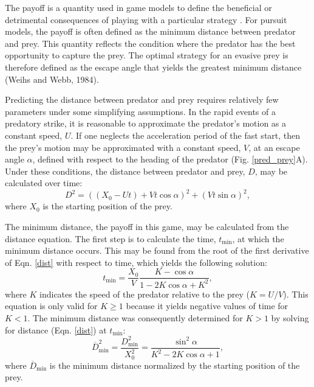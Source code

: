 \documentclass[12pt]{article}
\newcommand{\ol}{\overline}
\begin{document}
The payoff is a quantity used in game models to define the beneficial or
detrimental consequences of playing with a particular strategy
\citep{Webb:2007hg}. For pursuit models, the payoff is often defined as the
minimum distance between predator and prey. This quantity reflects the
condition where the predator has the best opportunity to capture the prey. The
optimal strategy for an evasive prey is therefore defined as the escape angle
that yields the greatest minimum distance (Weihs and Webb, 1984).

Predicting the distance between predator and prey requires relatively few
parameters under some simplifying assumptions. In the rapid events of a
predatory strike, it is reasonable to approximate the predator's motion as a
constant speed, $U$. If one neglects the acceleration period of the fast start,
then the prey's motion may be approximated with a constant speed, $V$, at an
escape angle $\alpha$, defined with respect to the heading of the predator
(Fig. \ref{pred_prey}A). Under these conditions, the distance between predator
and prey, $D$, may be calculated over time:
%
\begin{equation}
D^2 = ((X_0 - Ut) + Vt\cos\alpha)^2 + (Vt\sin\alpha)^2,
\label{dist}
\end{equation}
%
where $X_0$ is the starting position of the prey.

The minimum distance, the payoff in this game, may be calculated from the
distance equation. The first step is to calculate the time, $t_{\text{min}}$, 
at which the minimum distance occurs. This may be found from the root of the
first derivative of Eqn. \ref{dist} with respect to time, which yields the
following solution:
%
\begin{equation}
t_{\text{min}} = \frac{X_0}{V} \frac{K-\cos\alpha}{1-2 K\cos\alpha+K^2},
\label{eq33weihs}	
\end{equation}
%
where $K$ indicates the speed of the predator relative to the prey ($K = U/V$).
This equation is only valid for $K \geq 1$ because it yields negative
values of time for $K<1$. The minimum distance was consequently determined
 for $K>1$ by solving for distance (Eqn. \ref{dist}) at $t_{\text{min}}$:
%
\begin{equation}
\ol D_{\text{min}}^2 = \frac{D_{\text{min}}^2}{X_0^2} = \frac{\sin^2\alpha}{K^2
- 2K \cos\alpha + 1},
\label{dmin}
\end{equation}
where $\ol D_{\text{min}}$ is the minimum distance normalized by the starting
position of the prey.
\end{document}

